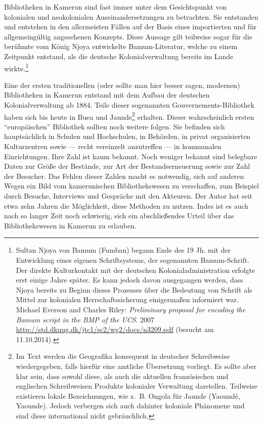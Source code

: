 \documentclass[a4paper,
fontsize=11pt,
oneside,
numbers=noperiodatend,
parskip=half-,
bibliography=totoc,
final
]{scrartcl}
\begin{document}
Bibliotheken in Kamerun sind fast immer unter dem Gesichtspunkt von
kolonialen und neokolonialen Auseinandersetzungen zu betrachten. Sie
entstanden und entstehen in den allermeisten Fällen auf der Basis eines
importierten und für allgemeingültig angesehenen Konzepts. Diese Aussage
gilt teilweise sogar für die berühmte vom König Njoya entwickelte
Bamum-Literatur, welche zu einem Zeitpunkt entstand, als die deutsche
Kolonialverwaltung bereits im Lande wirkte.\footnote{Sultan Njoya von
  Bamum (Fumban) begann Ende des 19 Jh. mit der Entwicklung eines
  eigenen Schriftsystems, der sogenannten Bamum-Schrift. Der direkte
  Kulturkontakt mit der deutschen Kolonialadministration erfolgte erst
  einige Jahre später. Es kann jedoch davon ausgegangen werden, dass
  Njoya bereits zu Beginn dieses Prozesses über die Bedeutung von
  Schrift als Mittel zur kolonialen Herrschaftssicherung einigermaßen
  informiert war. Michael Everson and Charles Riley: \emph{Preliminary
  proposal for encoding the Bamum script in the BMP of the UCS}. 2007
  \url{http://std.dkuug.dk/jtc1/sc2/wg2/docs/n3209.pdf} (besucht am
  11.10.2014).}

Eine der ersten traditionellen (oder sollte man hier besser sagen,
modernen) Bibliotheken in Kamerun entstand mit dem Aufbau der deutschen
Kolonialverwaltung ab 1884. Teile dieser sogenannten
Gouvernements-Bibliothek haben sich bis heute in Buea und
Jaunde\footnote{Im Text werden die Geografika konsequent in deutscher
  Schreibweise wiedergegeben, falls hierfür eine amtliche Übersetzung
  vorliegt. Es sollte aber klar sein, dass sowohl diese, als auch die
  aktuellen französischen und englischen Schreibweisen Produkte
  kolonialer Verwaltung darstellen. Teilweise existieren lokale
  Bezeichnungen, wie z.~B. Ongola für Jaunde (Yaoundé, Yaounde). Jedoch
  verbergen sich auch dahinter koloniale Phänomene und sind diese
  international nicht gebräuchlich.} erhalten. Dieser wahrscheinlich
ersten \enquote{europäischen} Bibliothek sollten noch weitere folgen.
Sie befinden sich hauptsächlich in Schulen und Hochschulen, in Behörden,
in privat organisierten Kulturzentren sowie --- recht vereinzelt
anzutreffen --- in kommunalen Einrichtungen. Ihre Zahl ist kaum bekannt.
Noch weniger bekannt sind belegbare Daten zur Größe der Bestände, zur
Art der Bestandserneuerung sowie zur Zahl der Besucher. Das Fehlen
dieser Zahlen macht es notwendig, sich auf anderen Wegen ein Bild vom
kamerunischen Bibliothekswesen zu verschaffen, zum Beispiel durch
Besuche, Interviews und Gespräche mit den Akteuren. Der Autor hat seit
etwa zehn Jahren die Möglichkeit, diese Methoden zu nutzen. Indes ist es
auch nach so langer Zeit noch schwierig, sich ein abschließendes Urteil
über das Bibliothekswesen in Kamerun zu erlauben.
\end{document}
